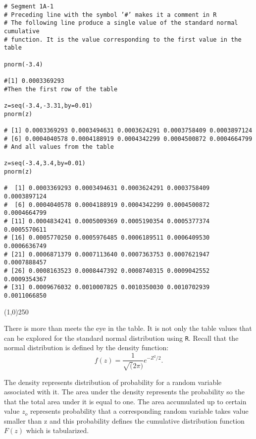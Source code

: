 \begin{verbatim}
# Segment 1A-1
# Preceding line with the symbol ’#’ makes it a comment in R
# The following line produce a single value of the standard normal cumulative
# function. It is the value corresponding to the first value in the table

pnorm(-3.4)

#[1] 0.0003369293
#Then the first row of the table

z=seq(-3.4,-3.31,by=0.01)
pnorm(z)

# [1] 0.0003369293 0.0003494631 0.0003624291 0.0003758409 0.0003897124
# [6] 0.0004040578 0.0004188919 0.0004342299 0.0004500872 0.0004664799
# And all values from the table

z=seq(-3.4,3.4,by=0.01)
pnorm(z)

#  [1] 0.0003369293 0.0003494631 0.0003624291 0.0003758409 0.0003897124
#  [6] 0.0004040578 0.0004188919 0.0004342299 0.0004500872 0.0004664799
# [11] 0.0004834241 0.0005009369 0.0005190354 0.0005377374 0.0005570611
# [16] 0.0005770250 0.0005976485 0.0006189511 0.0006409530 0.0006636749
# [21] 0.0006871379 0.0007113640 0.0007363753 0.0007621947 0.0007888457
# [26] 0.0008163523 0.0008447392 0.0008740315 0.0009042552 0.0009354367
# [31] 0.0009676032 0.0010007825 0.0010350030 0.0010702939 0.0011066850

\end{verbatim}
\begin{center}
	\line(1,0){250}
\end{center}
\newpage
There is more than meets the eye in the table. It is not only the table values that can be explored for the
standard normal distribution using \texttt{R}. Recall that the normal
distribution is defined by the density function:
\[
f(z) = \frac{1}{\sqrt(2 \pi)}e^{-Z^2/2}.
\]

The density represents distribution of probability for a random variable associated with it.
The area under the density represents the probability so the that the total area under it is equal to one.
The area accumulated up to certain value $z_o$ represents probability that a corresponding random variable takes
value smaller than z and this probability defines the cumulative distribution function $F(z)$ which is tabularized.


